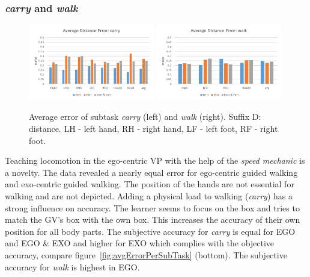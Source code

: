 \subsubsection{\textit{carry} and \textit{walk}}
\begin{figure}[htb]
	\centering
	\includegraphics[width=0.49\textwidth]{figures/distanceErrorCarry.png}
	\includegraphics[width=0.49\textwidth]{figures/distanceErrorWalk.png}
	\caption[Average error of subtasks \textit{carry} and \textit{walk}]{Average error of subtask \textit{carry} (left) and \textit{walk} (right). Suffix D: distance. LH - left hand, RH - right hand, LF - left foot, RF - right foot.}
	\label{fig:walkError}
\end{figure}
Teaching locomotion in the ego-centric VP with the help of the \textit{speed mechanic} is a novelty. The data revealed a nearly equal error for ego-centric guided walking and exo-centric guided walking. The position of the hands are not essential for walking and are not depicted. Adding a physical load to walking (\textit{carry}) has a strong influence on accuracy. The learner seems to focus on the box and tries to match the GV's box with the own box. This increases the accuracy of their own position for all body parts. The subjective accuracy for \textit{carry} is equal for EGO and EGO \& EXO and higher for EXO which complies with the objective accuracy, compare figure~\ref{fig:avgErrorPerSubTask} (bottom). The subjective accuracy for \textit{walk} is highest in EGO.

